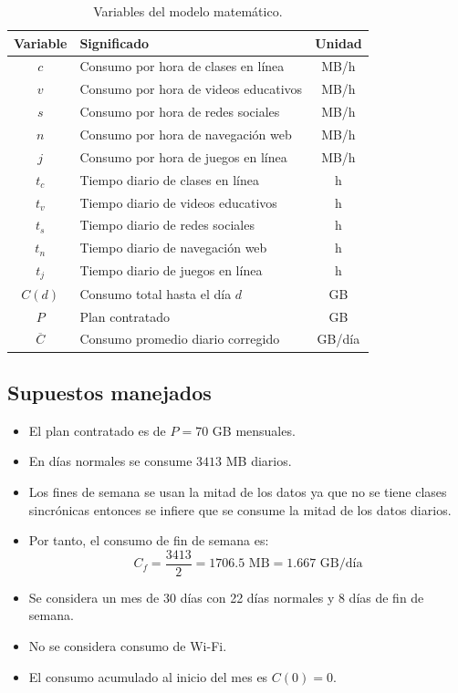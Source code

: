 \documentclass[12pt,a4paper]{article}
\begin{document}
\begin{center}
		\begin{table}[H]
			\centering
			\renewcommand{\arraystretch}{1.3}
			\begin{tabular}{|c|p{7cm}|c|}
				\hline
				\rowcolor{azulclaro}
				\textbf{Variable} & \textbf{Significado} & \textbf{Unidad} \\ \hline
				$c$ & Consumo por hora de clases en línea & MB/h \\ \hline
				$v$ & Consumo por hora de videos educativos & MB/h \\ \hline
				$s$ & Consumo por hora de redes sociales & MB/h \\ \hline
				$n$ & Consumo por hora de navegación web & MB/h \\ \hline
				$j$ & Consumo por hora de juegos en línea & MB/h \\ \hline
				$t_c$ & Tiempo diario de clases en línea & h \\ \hline
				$t_v$ & Tiempo diario de videos educativos & h \\ \hline
				$t_s$ & Tiempo diario de redes sociales & h \\ \hline
				$t_n$ & Tiempo diario de navegación web & h \\ \hline
				$t_j$ & Tiempo diario de juegos en línea & h \\ \hline
				$C(d)$ & Consumo total hasta el día $d$ & GB \\ \hline
				$P$ & Plan contratado & GB \\ \hline
				$\overline{C}$ & Consumo promedio diario corregido & GB/día \\ \hline
			\end{tabular}
			\caption{Variables del modelo matemático.}
		\end{table}
		
		\subsection{Supuestos manejados}
		
		\begin{itemize}
			\item El plan contratado es de $P=70$ GB mensuales.
			\item En días normales se consume $3413$ MB diarios.
			\item Los fines de semana se usan la mitad de los datos ya que no se tiene clases sincrónicas entonces se infiere que se consume la mitad de los datos diarios.
			\item Por tanto, el consumo de fin de semana es:
			\[
			C_f=\frac{3413}{2}=1706.5\text{ MB}=1.667\text{ GB/día}
			\]
			\item Se considera un mes de 30 días con 22 días normales y 8 días de fin de semana.
			\item No se considera consumo de Wi-Fi.
			\item El consumo acumulado al inicio del mes es $C(0)=0$.
		\end{itemize}
		

\end{center}
\end{document}
